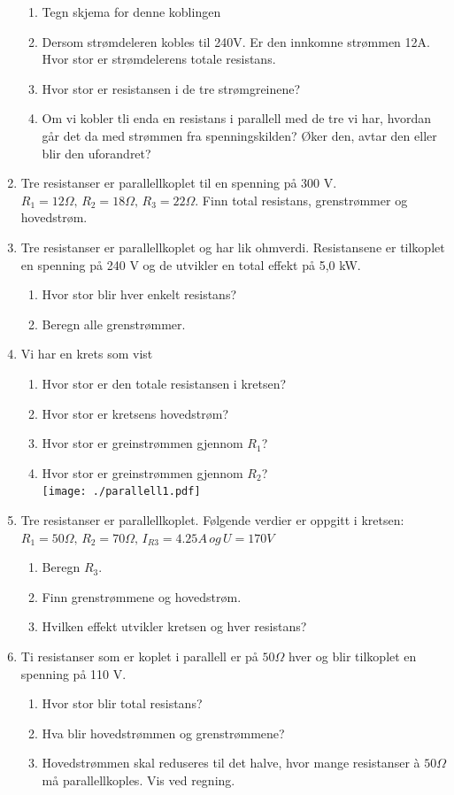\documentclass[12pt,a4paper]{article}
\begin{document}
\begin{enumerate}
\begin{enumerate}
\item Tegn skjema for denne koblingen
\item Dersom strømdeleren kobles til 240V. Er den innkomne strømmen 12A.
Hvor stor er strømdelerens totale resistans. 
\item Hvor stor er resistansen i de tre strømgreinene?
\item Om vi kobler tli enda en resistans i parallell med de tre vi har,
hvordan går det da med strømmen fra spenningskilden? Øker den, avtar
den eller blir den uforandret?
\end{enumerate}
\item Tre resistanser er parallellkoplet til en spenning på 300 V. $R_{1}=12\Omega,\,R_{2}=18\Omega,\,R_{3}=22\Omega$.
Finn total resistans, grenstrømmer og hovedstrøm.
\item Tre resistanser er parallellkoplet og har lik ohmverdi. Resistansene
er tilkoplet en spenning på 240 V og de utvikler en total effekt på
5,0 kW.

\begin{enumerate}
\item Hvor stor blir hver enkelt resistans?
\item Beregn alle grenstrømmer.
\end{enumerate}
\item Vi har en krets som vist

\begin{enumerate}
\item Hvor stor er den totale resistansen i kretsen?
\item Hvor stor er kretsens hovedstrøm?
\item Hvor stor er greinstrømmen gjennom $R_{1}$?
\item Hvor stor er greinstrømmen gjennom $R_{2}$?\\
\texttt{[image: ./parallell1.pdf]}
\end{enumerate}
\item Tre resistanser er parallellkoplet. Følgende verdier er oppgitt i
kretsen: $R_{1}=50\Omega,\,R_{2}=70\Omega,\,I_{R3}=4.25A\,og\,U=170V$

\begin{enumerate}
\item Beregn $R_{3}$.
\item Finn grenstrømmene og hovedstrøm.
\item Hvilken effekt utvikler kretsen og hver resistans?
\end{enumerate}
\item Ti resistanser som er koplet i parallell er på $50\Omega$ hver og
blir tilkoplet en spenning på 110 V.

\begin{enumerate}
\item Hvor stor blir total resistans?
\item Hva blir hovedstrømmen og grenstrømmene?
\item Hovedstrømmen skal reduseres til det halve, hvor mange resistanser
à $50\Omega$ må parallellkoples. Vis ved regning.
\end{enumerate}
\end{enumerate}
\end{document}
